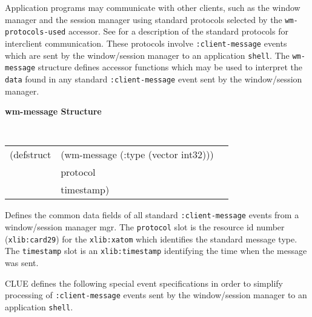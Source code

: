 \documentclass[twoside]{book}
\begin{document}
\begin{sloppy}
\begin{flushright}
{}\end{flushright}

Application
programs may communicate with other clients, such as the window manager and the
session manager  using standard
protocols selected by the {\tt wm-protocols-used}
accessor. See \cite{icccm} for a description of the standard protocols for
interclient communication. These protocols involve {\tt :client-message} events
which are sent by the window/session manager to an application {\tt shell}. The
{\tt wm-message} structure defines accessor functions which may be used to
interpret the
{\tt data} found in any standard {\tt :client-message} event sent by the
window/session manager.

{\samepage
{\large {\bf wm-message \hfill Structure}} 
\begin{flushright} 
\parbox[t]{6.125in}{
\tt
\begin{tabular}{lll}
(defstruct & (wm-message (:type (vector int32))) \\
           & protocol \\
           & timestamp)\\
\end{tabular}
\rm

}\end{flushright}}

\begin{flushright} \parbox[t]{6.125in}{
Defines the common data fields of all standard {\tt :client-message} events from
a window/session manager mgr. The {\tt protocol} slot is 
the resource id number ({\tt xlib:card29}) for the {\tt xlib:xatom} which
identifies the
standard message type. The {\tt timestamp} slot is an {\tt xlib:timestamp}
identifying the time when the message was sent.

}\end{flushright}



CLUE defines the following special event specifications  in order to simplify processing
of {\tt :client-message} events sent by the window/session manager to an
application {\tt shell}.


\end{sloppy}
\end{document}

